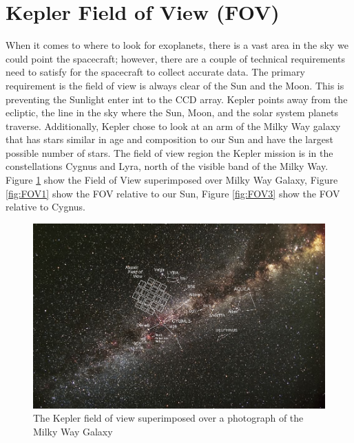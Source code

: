 \section{Kepler Field of View (FOV)}
When it comes to where to look for exoplanets, there is a vast area in the sky we could point the spacecraft; however, there are a couple of technical requirements need to satisfy for the spacecraft to collect accurate data. The primary requirement is the field of view is always clear of the Sun and the Moon. This is preventing the Sunlight enter int to the CCD array. Kepler points away from the ecliptic, the line in the sky where the Sun, Moon, and the solar system planets traverse. Additionally, Kepler chose to look at an arm of the Milky Way galaxy that has stars similar in age and composition to our Sun and have the largest possible number of stars. The field of view region the Kepler mission is in the constellations Cygnus and Lyra, north of the visible band of the Milky Way. Figure \ref{fig:FOV2} show the Field of View superimposed over Milky Way Galaxy, Figure \ref{fig:FOV1} show the FOV relative to our Sun, Figure \ref{fig:FOV3} show the FOV relative to Cygnus. 
\begin{figure}[!h]
\begin{center}
        \includegraphics[width=0.55\textheight]{img/FOV2.png}
        \caption{The Kepler field of view superimposed over a photograph of the Milky Way Galaxy}  \label{fig:FOV2}
\end{center}
\end{figure}
